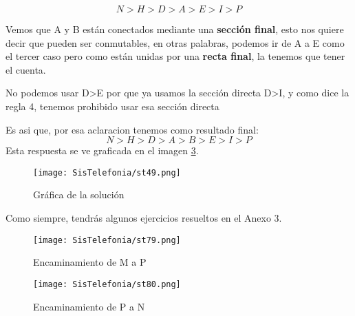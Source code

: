 \documentclass[
	12pt, %
	fleqn, %
	a4paper, %
	oneside, %
]{LegrandOrangeBook}
\begin{document}
\begin{example}
\begin{displaymath}
N>H>D>A>E>I>P
\end{displaymath}
\begin{remark}
Vemos que A y B están conectados mediante una \textbf{sección final}, esto nos quiere decir que pueden ser conmutables, en otras palabras, podemos ir de A a E como el tercer caso pero como están unidas por una \textbf{recta final}, la tenemos que tener el cuenta.
\end{remark}
\begin{remark}
No podemos usar D>E por que ya usamos la sección directa D>I, y como dice la regla 4, tenemos prohibido usar esa sección directa 
\end{remark}
Es asi que, por esa aclaracion tenemos como resultado final:
\begin{displaymath}
N>H>D>A>B>E>I>P
\end{displaymath}
Esta respuesta se ve graficada en el imagen \ref{fig:solu6.5}.
\end{example}
\begin{figure}[H]
\centering
\texttt{[image: SisTelefonia/st49.png]}
\caption{Gráfica de la solución}
\label{fig:solu6.5}
\end{figure}
Como siempre, tendrás algunos ejercicios resueltos en el Anexo 3.
\begin{figure}[H]
\centering
\texttt{[image: SisTelefonia/st79.png]}
\caption{Encaminamiento de M a P}
\label{fig:encaminamientomp}
\end{figure}
\begin{figure}[H]
\centering
\texttt{[image: SisTelefonia/st80.png]}
\caption{Encaminamiento de P a N}
\label{fig:solu6.5}
\end{figure}
\end{document}
